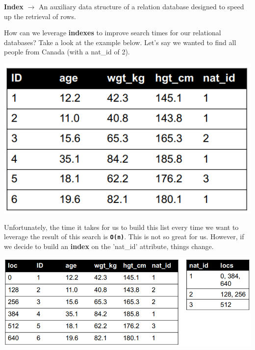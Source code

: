 \documentclass[english, 10pt]{article}
\begin{document}
\begin{tcolorbox}[title=Definition:,colframe=red!75!black,colback=red!5!white,arc=0pt,fonttitle=\bfseries]
\textbf{Index} $\rightarrow$ An auxiliary data structure of a relation database designed to speed up the retrieval of rows.
\end{tcolorbox}


\hfill \break How can we leverage \textbf{indexes} to improve search times for our relational databases? Take a look at the example below. Let's say we wanted to find all people from Canada (with a nat\_id of 2).\\

{
\centering

\includegraphics[scale=0.35]{img/table_1.png} 

}

\hfill \break Unfortunately, the time it takes for us to build this list every time we want to leverage the result of this search is \texttt{\textbf{O(n)}}. This is not so great for us. However, if we decide to build an \textbf{index} on the 'nat\_id' attribute, things change. \\

{
\centering

\includegraphics[scale=0.35]{img/table_2.png} 

}
\end{document}
